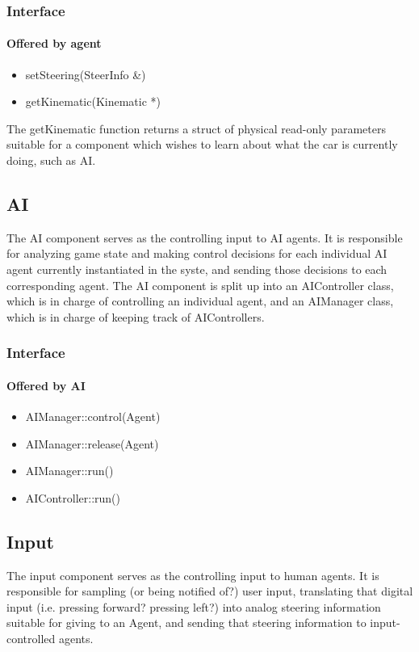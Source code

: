 \documentclass[12pt]{article}
\begin{document}
\subsubsection{Interface}

\paragraph{Offered by agent}
\begin{itemize}
\item setSteering(SteerInfo \&)
\item getKinematic(Kinematic *)
\end{itemize}
The getKinematic function returns a struct of physical read-only parameters
suitable for a component which wishes to learn about what the car is currently
doing, such as AI.

\subsection{AI}
The AI component serves as the controlling input to AI agents. It is responsible
for analyzing game state and making control decisions for each individual AI
agent currently instantiated in the syste, and sending those decisions to
each corresponding agent. The AI component is split up into an AIController
class, which is in charge of controlling an individual agent, and an AIManager
class, which is in charge of keeping track of AIControllers.

\subsubsection{Interface}

\paragraph{Offered by AI}
\begin{itemize}
\item AIManager::control(Agent)
\item AIManager::release(Agent)
\item AIManager::run()
\item AIController::run()
\end{itemize}

\subsection{Input}
The input component serves as the controlling input to human agents. It
is responsible for sampling (or being notified of?) user input, translating
that digital input (i.e. pressing forward? pressing left?) into analog
steering information suitable for giving to an Agent, and sending that steering
information to input-controlled agents.
\end{document}
